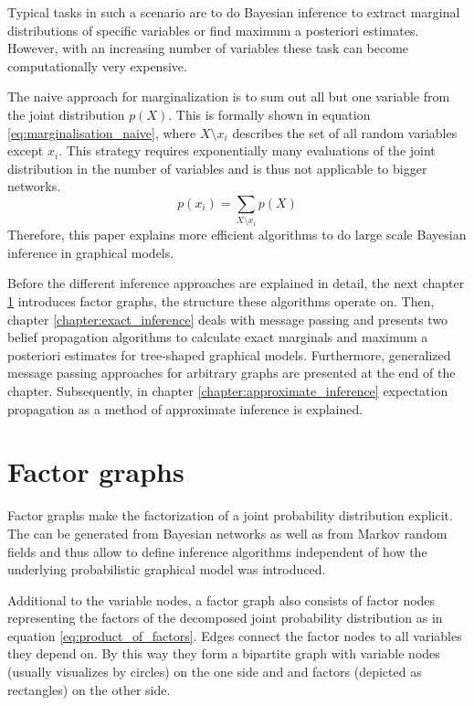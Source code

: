\documentclass{sigkdd}
\begin{document}
Typical tasks in such a scenario are to do Bayesian inference to extract marginal distributions of specific variables or find maximum a posteriori estimates. However, with an increasing number of variables these task can become computationally very expensive. 

The naive approach for marginalization is to sum out all but one variable from the joint distribution $p(X)$. This is formally shown in equation \ref{eq:marginalisation_naive}, where $X \setminus x_i$ describes the set of all random variables except $x_i$.
This strategy requires exponentially many evaluations of the joint distribution in the number of variables and is thus not applicable to bigger networks.
\begin{equation}\label{eq:marginalisation_naive}
p(x_i)= \sum_{X \setminus x_i} p(X)
\end{equation}
Therefore, this paper explains more efficient algorithms to do large scale Bayesian inference in graphical models. 

Before the different inference approaches are explained in detail, the next chapter \ref{chapter:fg} introduces factor graphs, the structure these algorithms operate on. Then, chapter \ref{chapter:exact_inference} deals with message passing and presents two belief propagation algorithms to calculate exact marginals and maximum a posteriori estimates for tree-shaped graphical models. Furthermore, generalized message passing approaches for arbitrary graphs are presented at the end of the chapter. Subsequently, in chapter \ref{chapter:approximate_inference} expectation propagation as a method of approximate inference is explained.

\section{Factor graphs}\label{chapter:fg}
Factor graphs make the factorization of a joint probability distribution explicit. The can be generated from Bayesian networks as well as from Markov random fields and thus allow to define inference algorithms independent of how the underlying probabilistic graphical model was introduced.

Additional to the variable nodes, a factor graph also consists of factor nodes representing the factors of the decomposed joint probability distribution as in equation  \ref{eq:product_of_factors}. Edges connect the factor nodes to all variables they depend on. By this way they form a bipartite graph with variable nodes (usually visualizes by circles) on the one side and and factors (depicted as rectangles) on the other side.
\end{document}
